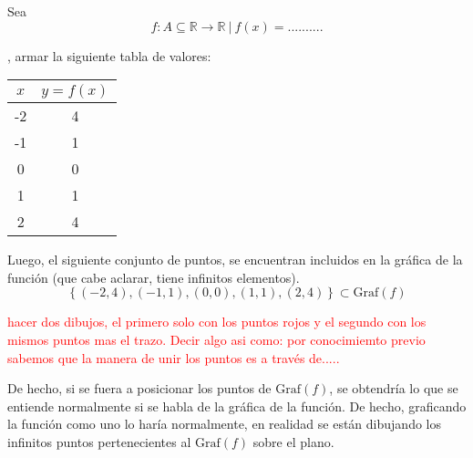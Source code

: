 \begin{example}  Sea $$f: A  \subseteq \mathbb{R} \rightarrow  \mathbb{R} \:|\:  f(x)=..........$$ 

,   armar la siguiente tabla de valores:
    \begin{table}[H]
        \centering
        \begin{tabular}{|c|c|}
            \hline
            $x$ & $y=f(x)$ \\ \hline
            -2  & 4        \\ \hline
            -1  & 1        \\ \hline
            0   & 0        \\ \hline
            1   & 1        \\ \hline
            2   & 4        \\ \hline
            \end{tabular}
      \end{table}
    Luego, el siguiente conjunto de puntos, se encuentran incluidos en la
    gráfica de la función (que cabe aclarar, tiene infinitos elementos).
    \begin{equation*}
        \left\{ (-2,4),(-1,1),(0,0),(1,1),(2,4) \right\}\subset \text{Graf}(f)
    \end{equation*}
  
  \textcolor{red}{hacer dos dibujos, el primero solo con los puntos rojos y el segundo con los mismos puntos mas el trazo. Decir algo asi como: por conocimiemto previo sabemos que la manera de unir los puntos es a trav\'es de..... }
  
    De hecho, si se fuera a posicionar los puntos de $\text{Graf}(f)$, se obtendría
    lo que se entiende normalmente si se habla de la gráfica de la función. De hecho,
    graficando la función como uno lo haría normalmente, en realidad
    se están dibujando los infinitos puntos pertenecientes
    al $\text{Graf}(f)$ sobre el plano.
    \begin{center}
        \end{center}
\end{example}
